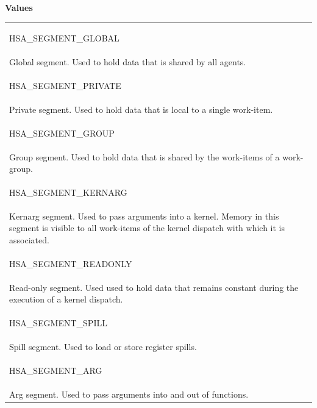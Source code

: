 \documentclass[final]{book}
\newcommand{\reftyp}[1]{#1}
\newcommand{\refenu}[1]{\reftyp{#1}}
\begin{document}
\noindent\textbf{Values}\\[-5mm]
\begin{longtable}{@{\hspace{2em}}p{\linewidth-2em}}
\hspace{-2em}\hypertarget{group__memory_1gga9aa2ffad72549139936d37692a4214dda0488a507ac10e730a5da4c7e88c9708b}{\refenu{HSA_\-SEGMENT_\-GLOBAL}} \\Global segment. Used to hold data that is shared by all agents.\\[2mm]
\hspace{-2em}\hypertarget{group__memory_1gga9aa2ffad72549139936d37692a4214dda8973c2316a8b2247b8a2a2f2546cde38}{\refenu{HSA_\-SEGMENT_\-PRIVATE}} \\Private segment. Used to hold data that is local to a single work-item.\\[2mm]
\hspace{-2em}\hypertarget{group__memory_1gga9aa2ffad72549139936d37692a4214ddad3e8c2fe02eb7e9febdacb51dff74d5e}{\refenu{HSA_\-SEGMENT_\-GROUP}} \\Group segment. Used to hold data that is shared by the work-items of a work-group.\\[2mm]
\hspace{-2em}\hypertarget{group__memory_1gga9aa2ffad72549139936d37692a4214dda79388d7547c31b8b90ada3f6e5470603}{\refenu{HSA_\-SEGMENT_\-KERNARG}} \\Kernarg segment. Used to pass arguments into a kernel. Memory in this segment is visible to all work-items of the kernel dispatch with which it is associated.\\[2mm]
\hspace{-2em}\hypertarget{group__memory_1gga9aa2ffad72549139936d37692a4214dda9a30a39c5916dd3e21f896442a71357e}{\refenu{HSA_\-SEGMENT_\-READONLY}} \\Read-only segment. Used used to hold data that remains constant during the execution of a kernel dispatch.\\[2mm]
\hspace{-2em}\hypertarget{group__memory_1gga9aa2ffad72549139936d37692a4214dda49c452f1685d135040e411f7f158bacf}{\refenu{HSA_\-SEGMENT_\-SPILL}} \\Spill segment. Used to load or store register spills.\\[2mm]
\hspace{-2em}\hypertarget{group__memory_1gga9aa2ffad72549139936d37692a4214ddacf2a4adb39685f23541290167b4b4c60}{\refenu{HSA_\-SEGMENT_\-ARG}} \\Arg segment. Used to pass arguments into and out of functions.
\end{longtable}
\end{document}
